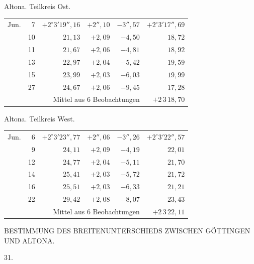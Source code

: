 \noindent\begin{minipage}[t]{.495\textwidth}\centering Altona. Teilkreis Ost.\par\smallskip
{\scriptsize\setlength{\tabcolsep}{1pt}\renewcommand{\arraystretch}{1.2}\begin{tabular}{lr|r|r|r|r|}
Jun.&7&$+2^\circ3'19''{,}16$&$+2''{,}10$&$-3''{,}57$&$+2^\circ3'17''{,}69$\\
&10&$21{,}13$&$+2{,}09$&$-4{,}50$&$18{,}72$\\
&11&$21{,}67$&$+2{,}06$&$-4{,}81$&$18{,}92$\\
&13&$22{,}97$&$+2{,}04$&$-5{,}42$&$19{,}59$\\
&15&$23{,}99$&$+2{,}03$&$-6{,}03$&$19{,}99$\\
&27&$24{,}67$&$+2{,}06$&$-9{,}45$&$17{,}28$\\
\cline{6-6}\multicolumn{5}{r}{Mittel aus 6 Beobachtungen}&$+2\,3\,18{,}70$
\end{tabular}}\end{minipage}\hfill\begin{minipage}[t]{.495\textwidth}\centering Altona. Teilkreis West.\par\smallskip
{\scriptsize\setlength{\tabcolsep}{1pt}\renewcommand{\arraystretch}{1.2}\begin{tabular}{lr|r|r|r|r}
Jun.&6&$+2^\circ3'23''{,}77$&$+2''{,}06$&$-3''{,}26$&$+2^\circ3'22''{,}57$\\
&9&$24{,}11$&$+2{,}09$&$-4{,}19$&$22{,}01$\\
&12&$24{,}77$&$+2{,}04$&$-5{,}11$&$21{,}70$\\
&14&$25{,}41$&$+2{,}03$&$-5{,}72$&$21{,}72$\\
&16&$25{,}51$&$+2{,}03$&$-6{,}33$&$21{,}21$\\
&22&$29{,}42$&$+2{,}08$&$-8{,}07$&$23{,}43$\\
\cline{6-6}\multicolumn{5}{r}{Mittel aus 6 Beobachtungen}&$+2\,3\,22{,}11$
\end{tabular}}\end{minipage}
\par\vspace{4mm}

\clearpage
\noindent{}\parbox[t]{\dimexpr\textwidth-10mm\relax}{\centering\scriptsize BESTIMMUNG DES BREITENUNTERSCHIEDS ZWISCHEN GÖTTINGEN UND ALTONA.}\par
\begin{center}31.\end{center}

